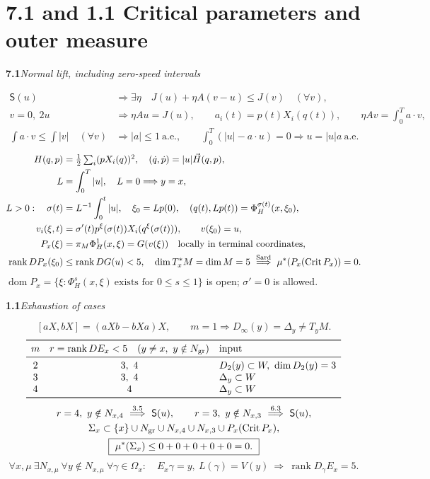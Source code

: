 \documentclass[11pt]{article}
\newcommand{\rk}{\operatorname{rank}}
\newcommand{\Crit}{\operatorname{Crit}}
\newcommand{\suppc}{\mathsf{S}}
\newcommand{\rowhead}[2]{\par\medskip\noindent\textbf{#1}\quad\textit{#2}\par}
\newcommand{\newpart}[1]{\clearpage\section*{#1}}
\begin{document}
\newpart{7.1 and 1.1 \quad Critical parameters and outer measure}
\rowhead{7.1}{Normal lift, including zero-speed intervals}
\begin{align*}
 \suppc(u)&\Longrightarrow
 \exists\eta\quad J(u)+\eta A(v-u)\le J(v)\quad(\forall v),\\
 v=0,\ 2u&\Longrightarrow \eta Au=J(u),\qquad
 a_i(t)=p(t)X_i(q(t)),\qquad \eta Av=\int_0^T a\cdot v,\\
 \int a\cdot v\le\int |v|\quad(\forall v)
 &\Longrightarrow |a|\le1\ \text{a.e.},\qquad
 \int_0^T(|u|-a\cdot u)=0\Longrightarrow u=|u|a\ \text{a.e.}
\end{align*}
\begin{align*}
 H(q,p)&=\tfrac12\textstyle\sum_i(pX_i(q))^2,\quad
 (\dot q,\dot p)=|u|\vec H(q,p),\\
 L&=\int_0^T |u|,\quad L=0\Longrightarrow y=x,\\
 L>0:\quad \sigma(t)&=L^{-1}\int_0^t|u|,\quad
 \xi_0=Lp(0),\quad
 (q(t),Lp(t))=\Phi_H^{\sigma(t)}(x,\xi_0),\\
 v_i(\xi,t)&=\sigma'(t)p^\xi(\sigma(t))X_i(q^\xi(\sigma(t))),\qquad
 v(\xi_0)=u,\\
 P_x(\xi)&=\pi_M\Phi_H^1(x,\xi)=G(v(\xi))\quad\text{locally in terminal coordinates},\\
 \rk DP_x(\xi_0)&\le \rk DG(u)<5,\quad
 \dim T_x^*M=\dim M=5
 \ \overset{\rm Sard}{\Longrightarrow}\
       \mu^*(P_x(\Crit P_x))=0 .
\end{align*}
$\operatorname{dom}P_x=\{\xi:\Phi_H^s(x,\xi)\ \text{exists for }0\le s\le1\}$
is open; $\sigma'=0$ is allowed.
\rowhead{1.1}{Exhaustion of cases}
\[
 [aX,bX]=(aXb-bXa)X,\qquad m=1\Longrightarrow D_\infty(y)=\Delta_y\ne T_yM .
\]
\[
\begin{array}{ccl}
\toprule
m & r=\rk DE_x<5\quad(y\ne x,\ y\notin N_{\rm gr}) & \text{input}\\
\midrule
2 & 3,\ 4 & D_2(y)\subset W,\ \dim D_2(y)=3\\
3 & 3,\ 4 & \Delta_y\subset W\\
4 & 4 & \Delta_y\subset W\\
\bottomrule
\end{array}
\]
\begin{gather*}
 r=4,\ y\notin N_{x,4}\ \overset{3.5}{\Longrightarrow}\ \suppc(u),\qquad
 r=3,\ y\notin N_{x,3}\ \overset{6.3}{\Longrightarrow}\ \suppc(u),\\
 \Sigma_x\subset \{x\}\cup N_{\rm gr}\cup N_{x,4}\cup N_{x,3}
                         \cup P_x(\Crit P_x),\\
 \boxed{\ \mu^*(\Sigma_x)\le 0+0+0+0+0=0.\ }
\end{gather*}
\[
 \forall x,\mu\ \exists N_{x,\mu}\ \forall y\notin N_{x,\mu}\ 
  \forall\gamma\in\Omega_x:\quad E_x\gamma=y,\ L(\gamma)=V(y)
          \ \Longrightarrow\ \rk D_\gamma E_x=5 .
\]
\end{document}
